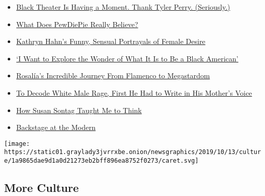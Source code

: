 \begin{itemize}
\tightlist
\item
  \href{https://www.nytimes3xbfgragh.onion/interactive/2019/10/09/magazine/tyler-perry-black-theater.html}{Black
  Theater Is Having a Moment. Thank Tyler Perry. (Seriously.)}
\item
  \href{https://www.nytimes3xbfgragh.onion/interactive/2019/10/09/magazine/PewDiePie-interview.html}{What
  Does PewDiePie Really Believe?}
\item
  \href{https://www.nytimes3xbfgragh.onion/interactive/2019/10/09/magazine/kathryn-hahn-mrs-fletcher.html}{Kathryn
  Hahn's Funny, Sensual Portrayals of Female Desire}
\item
  \href{https://www.nytimes3xbfgragh.onion/interactive/2019/10/08/magazine/black-women-artists-conversation.html}{`I
  Want to Explore the Wonder of What It Is to Be a Black American'}
\item
  \href{https://www.nytimes3xbfgragh.onion/interactive/2019/10/08/magazine/rosalia-flamenco.html}{Rosalía's
  Incredible Journey From Flamenco to Megastardom}
\item
  \href{https://www.nytimes3xbfgragh.onion/interactive/2019/10/08/magazine/ben-lerner-topeka-school.html}{To
  Decode White Male Rage, First He Had to Write in His Mother's Voice}
\item
  \href{https://www.nytimes3xbfgragh.onion/interactive/2019/10/08/magazine/susan-sontag.html}{How
  Susan Sontag Taught Me to Think}
\item
  \href{https://www.nytimes3xbfgragh.onion/interactive/2019/10/09/magazine/moma-reopening.html}{Backstage
  at the Modern}
\end{itemize}

\protect\hyperlink{}{} \protect\hyperlink{}{}

\texttt{[image: https://static01.graylady3jvrrxbe.onion/newsgraphics/2019/10/13/culture/1a9865dae9d1a0d21273eb2bff896ea8752f0273/caret.svg]}

\hypertarget{more-culture}{%
\subsection{More Culture}\label{more-culture}}


